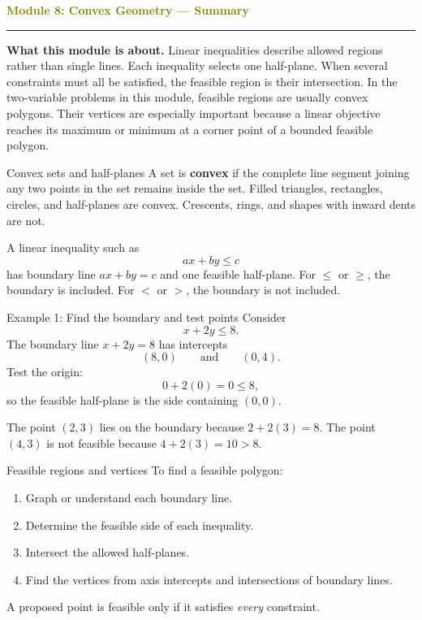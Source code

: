 \documentclass[11pt]{article}
\newcommand{\summaryhead}[2]{%
  \clearpage
  {\Large\bfseries\textcolor{olive}{Module #1: #2 — Summary}}\par
  \vspace{2pt}\textcolor{gold}{\rule{\linewidth}{1.2pt}}\par\smallskip
}
\begin{document}
\summaryhead{8}{Convex Geometry}

\textbf{What this module is about.} Linear inequalities describe allowed regions rather than single lines. Each inequality selects one half-plane. When several constraints must all be satisfied, the feasible region is their intersection. In the two-variable problems in this module, feasible regions are usually convex polygons. Their vertices are especially important because a linear objective reaches its maximum or minimum at a corner point of a bounded feasible polygon.

\begin{keybox}{Convex sets and half-planes}
A set is \textbf{convex} if the complete line segment joining any two points in the set remains inside the set. Filled triangles, rectangles, circles, and half-planes are convex. Crescents, rings, and shapes with inward dents are not.

A linear inequality such as
\[
ax+by\le c
\]
has boundary line \(ax+by=c\) and one feasible half-plane. For \(\le\) or \(\ge\), the boundary is included. For \(<\) or \(>\), the boundary is not included.
\end{keybox}

\begin{examplebox}{Example 1: Find the boundary and test points}
Consider
\[
x+2y\le8.
\]
The boundary line \(x+2y=8\) has intercepts
\[
(8,0)\qquad\text{and}\qquad(0,4).
\]
Test the origin:
\[
0+2(0)=0\le8,
\]
so the feasible half-plane is the side containing \((0,0)\).

The point \((2,3)\) lies on the boundary because \(2+2(3)=8\). The point \((4,3)\) is not feasible because \(4+2(3)=10>8\).
\end{examplebox}

\begin{keybox}{Feasible regions and vertices}
To find a feasible polygon:
\begin{enumerate}[label=\arabic*.]
\item Graph or understand each boundary line.
\item Determine the feasible side of each inequality.
\item Intersect the allowed half-planes.
\item Find the vertices from axis intercepts and intersections of boundary lines.
\end{enumerate}
A proposed point is feasible only if it satisfies \emph{every} constraint.
\end{keybox}
\end{document}
